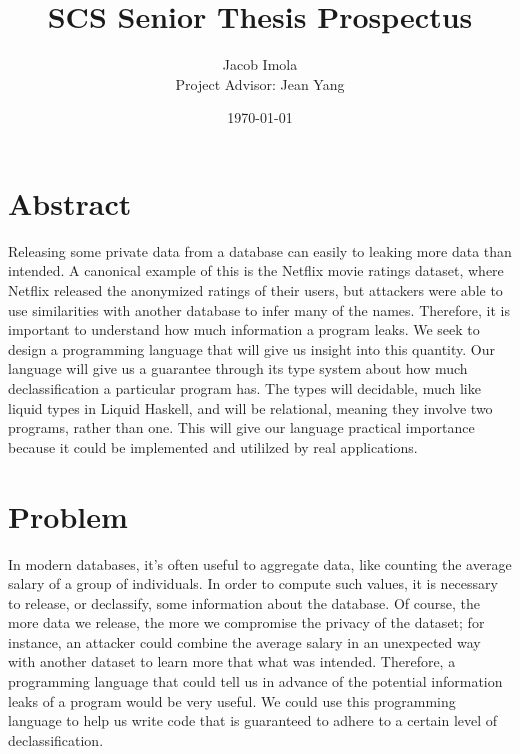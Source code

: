 \documentclass[11pt]{scrartcl}
\begin{document}
\title{SCS Senior Thesis Prospectus}
	\author{\textsf{Jacob Imola} \\ \textsf{Project Advisor: Jean Yang}}
\date{\textsf{\today}}
\maketitle

\section{Abstract}
Releasing some private data from a database can easily to leaking more data than intended. A canonical example of this is the Netflix movie ratings dataset, where Netflix released the anonymized ratings of their users, but attackers were able to use similarities with another database to infer many of the names. Therefore, it is important to understand how much information a program leaks. We seek to design a programming language that will give us insight into this quantity. Our language will give us a guarantee through its type system about how much declassification a particular program has. The types will decidable, much like liquid types in Liquid Haskell, and will be relational, meaning they involve two programs, rather than one. This will give our language practical importance because it could be implemented and utililzed by real applications.

\section{Problem}
In modern databases, it's often useful to aggregate data, like counting the average salary of a group of individuals. In order to compute such values, it is necessary to release, or declassify, some information about the database. Of course, the more data we release, the more we compromise the privacy of the dataset; for instance, an attacker could combine the average salary in an unexpected way with another dataset to learn more that what was intended. Therefore, a programming language that could tell us in advance of the potential information leaks of a program would be very useful. We could use this programming language to help us write code that is guaranteed to adhere to a certain level of declassification.
\end{document}
